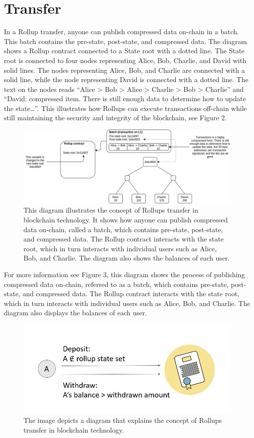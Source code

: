 \section{Transfer}
In a Rollup transfer, anyone can publish compressed data on-chain in a batch. This batch contains the pre-state, post-state, and compressed data. The diagram shows a Rollup contract connected to a State root with a dotted line. The State root is connected to four nodes representing Alice, Bob, Charlie, and David with solid lines. The nodes representing Alice, Bob, and Charlie are connected with a solid line, while the node representing David is connected with a dotted line. The text on the nodes reads “Alice > Bob > Alice > Charlie > Bob > Charlie” and “David: compressed item. There is still enough data to determine how to update the state…”. This illustrates how Rollups can execute transactions off-chain while still maintaining the security and integrity of the blockchain, see Figure 2.
\begin{center}
	\begin{figure}
		\centering
		\includegraphics[width=0.8\linewidth]{Fig/14/F2}
		\caption{This diagram illustrates the concept of Rollups transfer in blockchain technology. It shows how anyone can publish compressed data on-chain, called a batch, which contains pre-state, post-state, and compressed data. The Rollup contract interacts with the state root, which in turn interacts with individual users such as Alice, Bob, and Charlie. The diagram also shows the balances of each user.
		}
		\label{fig:f1}
	\end{figure}
\end{center}
For more information see Figure 3, this diagram shows the process of publishing compressed data on-chain, referred to as a batch, which contains pre-state, post-state, and compressed data. The Rollup contract interacts with the state root, which in turn interacts with individual users such as Alice, Bob, and Charlie. The diagram also displays the balances of each user.
\begin{center}
	\begin{figure}
		\centering
		\includegraphics[width=0.8\linewidth]{Fig/14/F3}
		\caption{The image depicts a diagram that explains the concept of Rollups transfer in blockchain technology.
		}
		\label{fig:f1}
	\end{figure}
\end{center}

